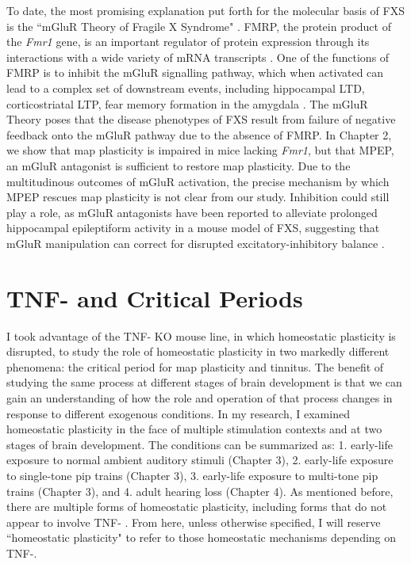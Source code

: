 To date, the most promising explanation put forth for the molecular basis of FXS is the ``mGluR Theory of Fragile X Syndrome" \cite{Bear2004}. FMRP, the protein product of the \textit{Fmr1} gene, is an important regulator of protein expression through its interactions with a wide variety of mRNA transcripts \cite{Brown2001}. One of the functions of FMRP is to inhibit the mGluR signalling pathway, which when activated can lead to a complex set of downstream events, including hippocampal LTD, corticostriatal LTP, fear memory formation in the amygdala \cite{Oliet1997, Gubellini2003, Rodrigues2002}. The mGluR Theory poses that the disease phenotypes of FXS result from failure of negative feedback onto the mGluR pathway due to the absence of FMRP. In Chapter 2, we show that map plasticity is impaired in mice lacking \textit{Fmr1}, but that MPEP, an mGluR antagonist is sufficient to restore map plasticity. Due to the multitudinous outcomes of mGluR activation, the precise mechanism by which MPEP rescues map plasticity is not clear from our study. Inhibition could still play a role, as mGluR antagonists have been reported to alleviate prolonged hippocampal epileptiform activity in a mouse model of FXS, suggesting that mGluR manipulation can correct for disrupted excitatory-inhibitory balance \cite{Chuang2005}.

\section{TNF-\textalpha{} and Critical Periods}

I took advantage of the TNF-\textalpha{} KO mouse line, in which homeostatic plasticity is disrupted, to study the role of homeostatic plasticity in two markedly different phenomena: the critical period for map plasticity and tinnitus.
The benefit of studying the same process at different stages of brain development is that we can gain an understanding of how the role and operation of that process changes in response to different exogenous conditions. In my research, I examined homeostatic plasticity in the face of multiple stimulation contexts and at two stages of brain development. The conditions can be summarized as: 1. early-life exposure to normal ambient auditory stimuli (Chapter 3), 2. early-life exposure to single-tone pip trains (Chapter 3), 3. early-life exposure to multi-tone pip trains (Chapter 3), and 4. adult hearing loss (Chapter 4). As mentioned before, there are multiple forms of homeostatic plasticity, including forms that do not appear to involve TNF-\textalpha{} \cite{Stellwagen2006}. From here, unless otherwise specified, I will reserve ``homeostatic plasticity" to refer to those homeostatic mechanisms depending on TNF-\textalpha{}.

